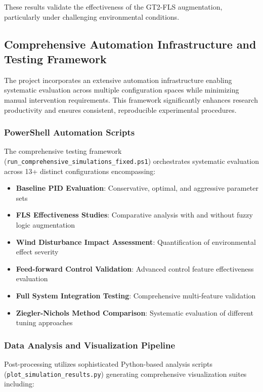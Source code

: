 These results validate the effectiveness of the GT2-FLS augmentation, particularly under challenging environmental conditions.

\subsection*{Comprehensive Automation Infrastructure and Testing Framework}

The project incorporates an extensive automation infrastructure enabling systematic evaluation across multiple configuration spaces while minimizing manual intervention requirements. This framework significantly enhances research productivity and ensures consistent, reproducible experimental procedures.

\subsubsection*{PowerShell Automation Scripts}

The comprehensive testing framework (\texttt{run\_comprehensive\_simulations\_fixed.ps1}) orchestrates systematic evaluation across 13+ distinct configurations encompassing:

\begin{itemize}
    \item \textbf{Baseline PID Evaluation}: Conservative, optimal, and aggressive parameter sets
    \item \textbf{FLS Effectiveness Studies}: Comparative analysis with and without fuzzy logic augmentation
    \item \textbf{Wind Disturbance Impact Assessment}: Quantification of environmental effect severity
    \item \textbf{Feed-forward Control Validation}: Advanced control feature effectiveness evaluation
    \item \textbf{Full System Integration Testing}: Comprehensive multi-feature validation
    \item \textbf{Ziegler-Nichols Method Comparison}: Systematic evaluation of different tuning approaches
\end{itemize}

\subsubsection*{Data Analysis and Visualization Pipeline}

Post-processing utilizes sophisticated Python-based analysis scripts (\texttt{plot\_simulation\_results.py}) generating comprehensive visualization suites including:

